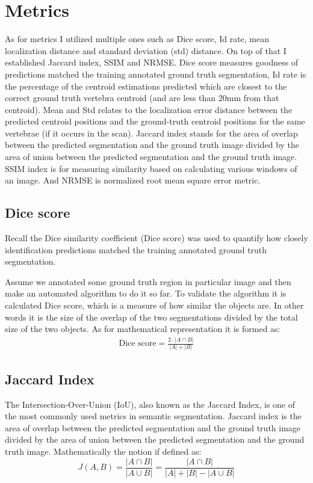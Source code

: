 \newpage
\section{Metrics}
As for metrics I utilized multiple ones such as Dice score, Id rate, mean localization distance and standard deviation (std) distance. On top of that I established Jaccard index, SSIM and NRMSE. Dice score measures goodness of predictions matched the training annotated ground truth segmentation, Id rate is the percentage of the centroid estimations predicted which are closest to the correct ground truth vertebra centroid (and are less than 20mm from that centroid). Mean and Std relates to the localization error distance between the predicted centroid positions and the ground-truth centroid positions for the same vertebrae (if it occurs in the scan). Jaccard index stands for the area of overlap between the predicted segmentation and the ground truth image divided by the area of union between the predicted segmentation and the ground truth image. SSIM index is for measuring similarity based on calculating various windows of an image. And NRMSE is normalized root mean square error metric. 

\subsection{Dice score}
Recall the \cite{Thada2013} Dice similarity coefficient (Dice score) was used to quantify how closely identification predictions matched the training annotated ground truth segmentation. 

Assume we annotated some ground truth region in particular image and then make an automated algorithm to do it so far. To validate the algorithm it is calculated Dice score, which is a measure of how similar the objects are. In other words it is the size of the overlap of the two segmentations divided by the total size of the two objects. As for mathematical representation it is formed as:
\begin{align*}
  \text{Dice score} = \frac{2\cdot | A\cap B|}{|A| + |B|}
\end{align*}

\subsection{Jaccard Index}
The Intersection-Over-Union (IoU), also known as the Jaccard Index, is one of the most commonly used metrics in semantic segmentation. Jaccard index is the area of overlap between the predicted segmentation and the ground truth image divided by the area of union between the predicted segmentation and the ground truth image. Mathematically the notion if defined as: 
\[ J(A,B) = \frac{|A \cap B|}{|A \cup B|} = \frac{|A \cap B|}{|A| + |B| - |A \cup B|}\]

